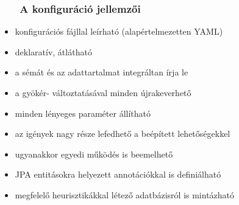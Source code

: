\documentclass[
]{beamer}
\newcommand{\slidetitle}[2]{\frametitle{{\small #1 ~ \ding{226} ~ } \normalsize \textbf{#2} }}
\begin{document}
\begin{frame}
    \slidetitle{\sectionshorttitle}{A konfiguráció jellemzői}
    
    \begin{itemize}
        \setlength\itemsep{0.5em}
        \item konfigurációs fájllal leírható (alapértelmezetten {\color{red}YAML})
        \item {\color{red}deklaratív}, átlátható
        \item a sémát és az adattartalmat integráltan írja le
        \item a gyökér- változtatásával minden {\color{red}újrakeverhető}
        \item minden lényeges paraméter állítható
        \item az igények nagy része lefedhető a beépített lehetőségekkel
        \item ugyanakkor {\color{red}egyedi működés} is beemelhető
        \item JPA entitásokra helyezett annotációkkal is definiálható
        \item megfelelő heurisztikákkal létező adatbázisról is mintázható
    \end{itemize}
\end{frame}
\end{document}
